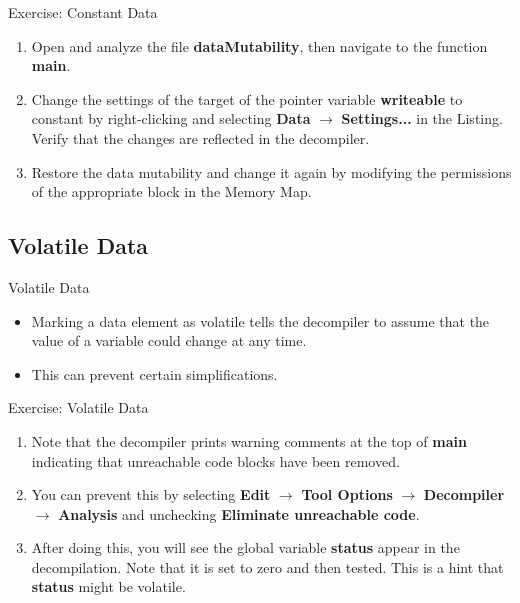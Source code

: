 \documentclass{beamer}
\begin{document}
\begin{frame}
\begin{block}{Exercise: Constant Data}
\begin{enumerate}
\item Open and analyze the file \textbf{dataMutability}, then navigate to the function \textbf{main}.
\item Change the settings of the target of the pointer variable \textbf{writeable} to constant by right-clicking and selecting \textbf{Data} $\rightarrow$ \textbf{Settings...} 
in the Listing.  Verify that the changes are reflected in the decompiler.
\item Restore the data mutability and change it again by modifying the permissions of the appropriate block in the Memory Map. 
\end{enumerate}
\end{block}
\end{frame}

\subsection{Volatile Data}
\begin{frame}
\begin{block}{Volatile Data}
\begin{itemize}
\item Marking a data element as volatile tells the decompiler to assume that the value of a variable could change at any time.
\item This can prevent certain simplifications.
\end{itemize}
\end{block}
\end{frame}

\begin{frame}
\begin{block}{Exercise: Volatile Data}
\begin{enumerate}
\item Note that the decompiler prints warning comments at the top of \textbf{main} indicating that unreachable code blocks have been removed.
\item You can prevent this by selecting \textbf{Edit} $\rightarrow$ \textbf{Tool Options} $\rightarrow$ \textbf{Decompiler} $\rightarrow$ \textbf{Analysis} and unchecking
\textbf {Eliminate unreachable code}.
\item After doing this, you will see the global variable \textbf{status} appear in the decompilation.  Note that it is set to zero and then tested.  This is a hint that
\textbf{status} might be volatile.
\end{enumerate}
\end{block}
\end{frame}
\end{document}
